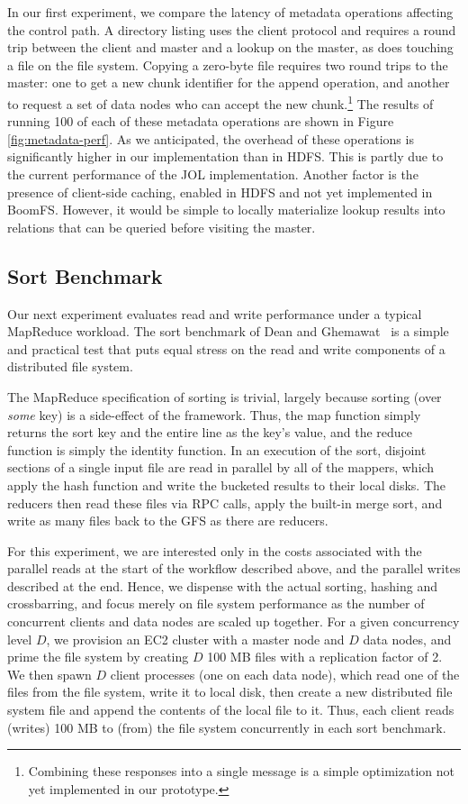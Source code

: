 \documentclass[twocolumn]{article}
\begin{document}
In our first experiment, we compare the latency of metadata operations
affecting the control path.  A directory listing uses the client
protocol and requires a round trip between the client and master and a
lookup on the master, as does touching a file on the file system.
Copying a zero-byte file requires two round trips to the master: one
to get a new chunk identifier for the append operation, and another to
request a set of data nodes who can accept the new
chunk.\footnote{Combining these responses into a single message is a
  simple optimization not yet implemented in our prototype.}  The
results of running 100 of each of these metadata operations are shown
in Figure \ref{fig:metadata-perf}.  As we anticipated, the overhead of
these operations is significantly higher in our implementation than in
HDFS.  This is partly due to the current performance of the JOL
implementation. Another factor is the presence of client-side caching,
enabled in HDFS and not yet implemented in BoomFS. However, it would
be simple to locally materialize lookup results into relations that
can be queried before visiting the master.

\subsection{Sort Benchmark}
\label{sort-perf-eval}
Our next experiment evaluates read and write performance under a
typical MapReduce workload.  The sort benchmark of Dean and
Ghemawat~\cite{mapreduce} is a simple and practical test that puts
equal stress on the read and write components of a distributed
file system.

The MapReduce specification of sorting is trivial, largely because
sorting (over \emph{some} key) is a side-effect of the framework.
Thus, the map function simply returns the sort key and the entire line
as the key's value, and the reduce function is simply the identity
function.  In an execution of the sort, disjoint sections of a single
input file are read in parallel by all of the mappers, which apply the
hash function and write the bucketed results to their local disks.
The reducers then read these files via RPC calls, apply the built-in
merge sort, and write as many files back to the GFS as there are
reducers.

For this experiment, we are interested only in the costs associated
with the parallel reads at the start of the workflow described above,
and the parallel writes described at the end.  Hence, we dispense with
the actual sorting, hashing and crossbarring, and focus merely on file
system performance as the number of concurrent clients and data nodes
are scaled up together.  For a given concurrency level $D$, we
provision an EC2 cluster with a master node and $D$ data nodes, and
prime the file system by creating $D$ 100 MB files with a replication
factor of 2.  We then spawn $D$ client processes (one on each data
node), which read one of the files from the file system, write it to
local disk, then create a new distributed file system file and append
the contents of the local file to it.  Thus, each client reads
(writes) 100 MB to (from) the file system concurrently in each sort
benchmark.
\end{document}
